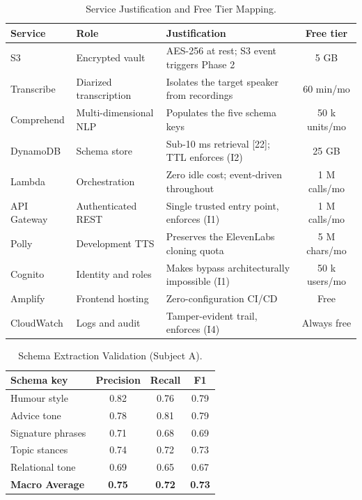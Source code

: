 \documentclass[journal]{IEEEtran}
\begin{document}
\begin{table}[htbp]
\caption{Service Justification and Free Tier Mapping.}
\label{tab:service_justification}
\centering
\begin{tabular}{lllc}
\toprule
\textbf{Service} & \textbf{Role} & \textbf{Justification} & \textbf{Free tier} \\
\midrule
S3          & Encrypted vault           & AES-256 at rest; S3 event triggers Phase 2        & 5 GB \\
Transcribe  & Diarized transcription    & Isolates the target speaker from recordings       & 60 min/mo \\
Comprehend  & Multi-dimensional NLP     & Populates the five schema keys                     & 50 k units/mo \\
DynamoDB    & Schema store              & Sub-10 ms retrieval [22]; TTL enforces (I2)        & 25 GB \\
Lambda      & Orchestration             & Zero idle cost; event-driven throughout            & 1 M calls/mo \\
API Gateway & Authenticated REST        & Single trusted entry point, enforces (I1)          & 1 M calls/mo \\
Polly       & Development TTS           & Preserves the ElevenLabs cloning quota             & 5 M chars/mo \\
Cognito     & Identity and roles        & Makes bypass architecturally impossible (I1)      & 50 k users/mo \\
Amplify     & Frontend hosting          & Zero-configuration CI/CD                           & Free \\
CloudWatch  & Logs and audit            & Tamper-evident trail, enforces (I4)                & Always free \\
\bottomrule
\end{tabular}
\end{table}


\begin{table}[htbp]
\caption{Schema Extraction Validation (Subject A).}
\label{tab:schema_extraction}
\centering
\begin{tabular}{lccc}
\toprule
\textbf{Schema key} & \textbf{Precision} & \textbf{Recall} & \textbf{F1} \\
\midrule
Humour style        & 0.82 & 0.76 & 0.79 \\
Advice tone         & 0.78 & 0.81 & 0.79 \\
Signature phrases   & 0.71 & 0.68 & 0.69 \\
Topic stances       & 0.74 & 0.72 & 0.73 \\
Relational tone     & 0.69 & 0.65 & 0.67 \\
\midrule
\textbf{Macro Average} & \textbf{0.75} & \textbf{0.72} & \textbf{0.73} \\
\bottomrule
\end{tabular}
\end{table}
\end{document}

